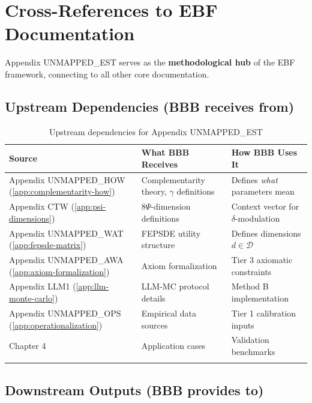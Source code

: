 \documentclass[11pt,a4paper]{article}
\theoremstyle{definition}
\begin{document}

\section{Cross-References to EBF Documentation}
\label{sec:bbb-crossref-expanded}

Appendix UNMAPPED_EST serves as the \textbf{methodological hub} of the EBF framework, 
connecting to all other core documentation.

\subsection{Upstream Dependencies (BBB receives from)}

\begin{longtable}{lp{4cm}p{6cm}}
\toprule
\textbf{Source} & \textbf{What BBB Receives} & \textbf{How BBB Uses It} \\
\midrule
\endfirsthead
Appendix UNMAPPED_HOW (\ref{app:complementarity-how}) & Complementarity theory, $\gamma$ definitions & Defines \textit{what} parameters mean \\
Appendix CTW (\ref{app:psi-dimensions}) & 8$\Psi$-dimension definitions & Context vector for $\delta$-modulation \\
Appendix UNMAPPED_WAT (\ref{app:fepsde-matrix}) & FEPSDE utility structure & Defines dimensions $d \in \mathcal{D}$ \\
Appendix UNMAPPED_AWA (\ref{app:axiom-formalization}) & Axiom formalization & Tier 3 axiomatic constraints \\
Appendix LLM1 (\ref{app:llm-monte-carlo}) & LLM-MC protocol details & Method B implementation \\
Appendix UNMAPPED_OPS (\ref{app:operationalization}) & Empirical data sources & Tier 1 calibration inputs \\
Chapter 4 & Application cases & Validation benchmarks \\
\bottomrule
\caption{Upstream dependencies for Appendix UNMAPPED_EST}
\end{longtable}

\subsection{Downstream Outputs (BBB provides to)}
\end{document}
